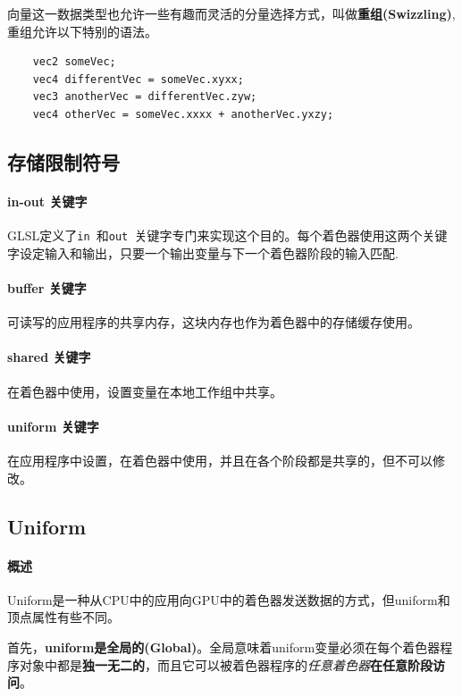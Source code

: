 \documentclass[UTF8,a4paper,12pt]{ctexbook}
\begin{document}
			向量这一数据类型也允许一些有趣而灵活的分量选择方式，叫做\textbf{重组(Swizzling)},重组允许以下特别的语法。
			\begin{lstlisting}
	vec2 someVec;
	vec4 differentVec = someVec.xyxx;
	vec3 anotherVec = differentVec.zyw;
	vec4 otherVec = someVec.xxxx + anotherVec.yxzy;			
			\end{lstlisting}
			
			
		\subsection{存储限制符号}
			
			\paragraph{in-out 关键字}
				GLSL定义了\verb|in |和\verb|out |关键字专门来实现这个目的。每个着色器使用这两个关键字设定输入和输出，只要一个输出变量与下一个着色器阶段的输入匹配.
			
			\paragraph{buffer 关键字}
				可读写的应用程序的共享内存，这块内存也作为着色器中的存储缓存使用。
				
			\paragraph{shared 关键字}
				在着色器中使用，设置变量在本地工作组中共享。
			
			\paragraph{uniform 关键字}
				在应用程序中设置，在着色器中使用，并且在各个阶段都是共享的，但不可以修改。
			
		\subsection{Uniform}
		
			\paragraph{概述}
				Uniform是一种从CPU中的应用向GPU中的着色器发送数据的方式，但uniform和顶点属性有些不同。
				
				首先，\textbf{uniform是全局的(Global)}。全局意味着uniform变量必须在每个着色器程序对象中都是\textbf{独一无二的}，而且它可以被着色器程序的\textit{任意着色器}\textbf{在任意阶段访问}。
				
\end{document}
